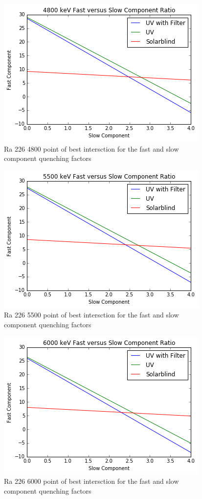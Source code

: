 \documentclass[aip, jmp, amsmath, amssymb, reprint, floatfix]{revtex4-1}
\begin{document}
\begin{figure}
  \centering
    \includegraphics[width=.8\columnwidth]{first.png}
  \caption{Ra 226 4800 point of best intersction for the fast and slow component quenching factors}
  \label{fig:first}
\end{figure} 

\begin{figure}
  \centering
    \includegraphics[width=.8\columnwidth]{second.png}
  \caption{Ra 226 5500 point of best intersction for the fast and slow component quenching factors}
  \label{fig:second}
\end{figure} 

\begin{figure}
  \centering
    \includegraphics[width=.8\columnwidth]{third.png}
  \caption{Ra 226 6000 point of best intersction for the fast and slow component quenching factors}
  \label{fig:third}
\end{figure} 
\end{document}

